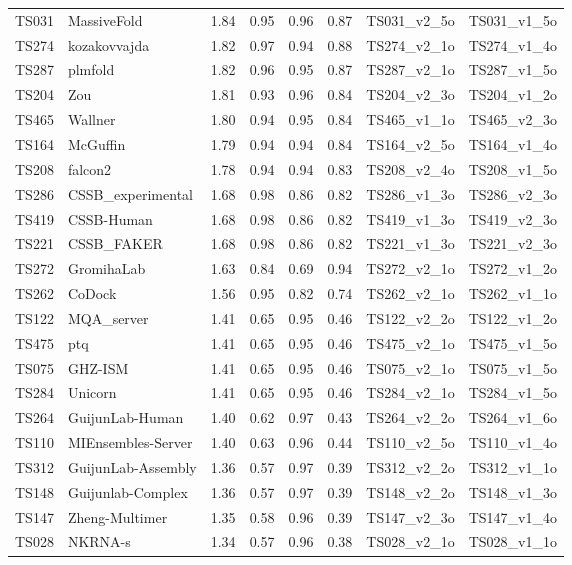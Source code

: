 \begin{table}[ht]
{\begin{tabular}{llllllll}
TS031 & MassiveFold & 1.84 & 0.95 & 0.96 & 0.87 & TS031\_v2\_5o & TS031\_v1\_5o \\ 
TS274 & kozakovvajda & 1.82 & 0.97 & 0.94 & 0.88 & TS274\_v2\_1o & TS274\_v1\_4o \\ 
TS287 & plmfold & 1.82 & 0.96 & 0.95 & 0.87 & TS287\_v2\_1o & TS287\_v1\_5o \\ 
TS204 & Zou & 1.81 & 0.93 & 0.96 & 0.84 & TS204\_v2\_3o & TS204\_v1\_2o \\ 
TS465 & Wallner & 1.80 & 0.94 & 0.95 & 0.84 & TS465\_v1\_1o & TS465\_v2\_3o \\ 
TS164 & McGuffin & 1.79 & 0.94 & 0.94 & 0.84 & TS164\_v2\_5o & TS164\_v1\_4o \\ 
TS208 & falcon2 & 1.78 & 0.94 & 0.94 & 0.83 & TS208\_v2\_4o & TS208\_v1\_5o \\ 
TS286 & CSSB\_experimental & 1.68 & 0.98 & 0.86 & 0.82 & TS286\_v1\_3o & TS286\_v2\_3o \\ 
TS419 & CSSB-Human & 1.68 & 0.98 & 0.86 & 0.82 & TS419\_v1\_3o & TS419\_v2\_3o \\ 
TS221 & CSSB\_FAKER & 1.68 & 0.98 & 0.86 & 0.82 & TS221\_v1\_3o & TS221\_v2\_3o \\ 
TS272 & GromihaLab & 1.63 & 0.84 & 0.69 & 0.94 & TS272\_v2\_1o & TS272\_v1\_2o \\ 
TS262 & CoDock & 1.56 & 0.95 & 0.82 & 0.74 & TS262\_v2\_1o & TS262\_v1\_1o \\ 
TS122 & MQA\_server & 1.41 & 0.65 & 0.95 & 0.46 & TS122\_v2\_2o & TS122\_v1\_2o \\ 
TS475 & ptq & 1.41 & 0.65 & 0.95 & 0.46 & TS475\_v2\_1o & TS475\_v1\_5o \\ 
TS075 & GHZ-ISM & 1.41 & 0.65 & 0.95 & 0.46 & TS075\_v2\_1o & TS075\_v1\_5o \\ 
TS284 & Unicorn & 1.41 & 0.65 & 0.95 & 0.46 & TS284\_v2\_1o & TS284\_v1\_5o \\ 
TS264 & GuijunLab-Human & 1.40 & 0.62 & 0.97 & 0.43 & TS264\_v2\_2o & TS264\_v1\_6o \\ 
TS110 & MIEnsembles-Server & 1.40 & 0.63 & 0.96 & 0.44 & TS110\_v2\_5o & TS110\_v1\_4o \\ 
TS312 & GuijunLab-Assembly & 1.36 & 0.57 & 0.97 & 0.39 & TS312\_v2\_2o & TS312\_v1\_1o \\ 
TS148 & Guijunlab-Complex & 1.36 & 0.57 & 0.97 & 0.39 & TS148\_v2\_2o & TS148\_v1\_3o \\ 
TS147 & Zheng-Multimer & 1.35 & 0.58 & 0.96 & 0.39 & TS147\_v2\_3o & TS147\_v1\_4o \\ 
TS028 & NKRNA-s & 1.34 & 0.57 & 0.96 & 0.38 & TS028\_v2\_1o & TS028\_v1\_1o \\ 

\end{tabular}}
\end{table}
